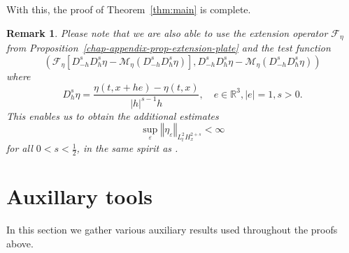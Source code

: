 \documentclass[10pt,a4paper]{article}
\newtheorem{remark}[theorem]{Remark}
\numberwithin{equation}{section}
\begin{document}
With this, the proof of Theorem~\ref{thm:main} is complete.
\begin{remark}
Please note that we are also able to use the extension operator $\mathcal{F}_{\eta}$ from Proposition~\ref{chap-appendix-prop-extension-plate} and the test function 
\[
\left(\mathcal{F}_{\eta}\left[D_{-h}^{s}D_{h}^{s}\eta-\mathcal{M}_{\eta}\left(D_{-h}^{s}D_{h}^{s}\eta\right)\right],D_{-h}^{s}D_{h}^{s}\eta-\mathcal{M}_{\eta}\left(D_{-h}^{s}D_{h}^{s}\eta\right)\right)
\]
where 
\[D_{h}^{s}\eta=\frac{\eta\left(t,x+he\right)-\eta\left(t,x\right)}{\left|h\right|^{s-1}h},\quad e\in\mathbb{R}^{3},\left|e\right|=1,s>0.\]
This enables us to obtain the additional estimates 
\begin{equation}
\sup_{\varepsilon}\left\Vert \eta_{\varepsilon}\right\Vert _{L_{t}^{2}H_{x}^{2+s}}<\infty
\end{equation}
for all $0<s<\frac{1}{2}$, in the same spirit as \cite{MS22}.
\end{remark}

\section{Auxillary tools}\label{chap:appendix}
In this section we gather various auxiliary results used throughout the proofs above.
\end{document}
